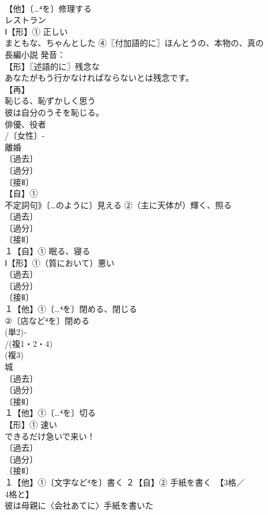 \documentclass[8pt]{extreport}
\begin{document}
\begin{CJK}{UTF8}{min}
\\	【他】〔…⁴を〕修理する
\\	レストラン
\\	Ⅰ【形】① 正しい 
\\	まともな、ちゃんとした ④〖付加語的に〗ほんとうの、本物の、真の 
\\	長編小説 発音：
\\	【形】〖述語的に〗残念な 
\\	あなたがもう行かなければならないとは残念です。
\\	【再】
\\	恥じる、恥ずかしく思う
\\	彼は自分のうそを恥じる。
\\	俳優、役者
\\	/〔女性〕-
\\	離婚 
\\	〔過去〕
\\	〔過分〕
\\	〔接Ⅱ〕
\\	【自】①
\\	不定詞句》〔…のように〕見える ②（主に天体が）輝く、照る
\\	〔過去〕
\\	〔過分〕
\\	〔接Ⅱ〕
\\	１【自】① 眠る、寝る 
\\	Ⅰ【形】①（質において）悪い
\\	〔過去〕
\\	〔過分〕
\\	〔接Ⅱ〕
\\	１【他】①〔…⁴を〕閉める、閉じる
\\	②〔店など⁴を〕閉める
\\	(単2)‐
\\	/(複1・2・4)
\\	(複3)
\\	城
\\	〔過去〕
\\	〔過分〕
\\	〔接Ⅱ〕
\\	１【他】①〔…⁴を〕切る 
\\	【形】① 速い 
\\	できるだけ急いで来い！
\\	〔過去〕
\\	〔過分〕
\\	〔接Ⅱ〕
\\	１【他】①〔文字など⁴を〕書く ２【自】② 手紙を書く　【3格／
\\	4格と】
\\	彼は母親に〈会社あてに〉手紙を書いた

\end{CJK}
\end{document}
